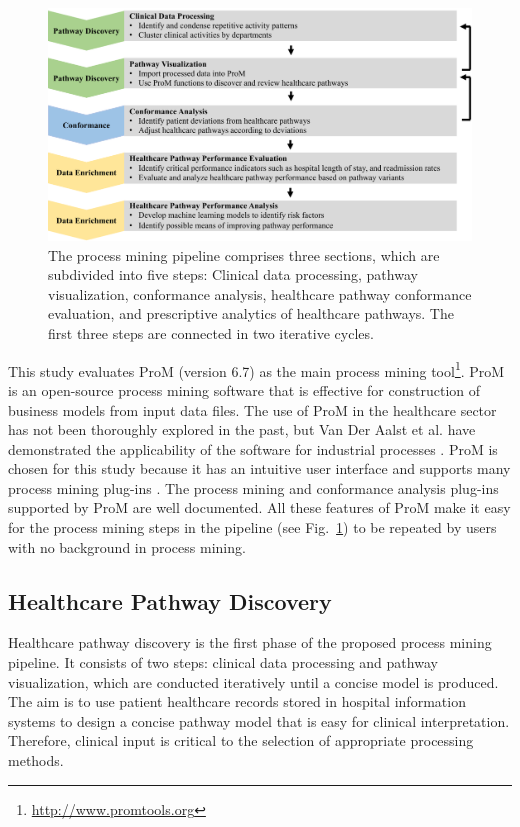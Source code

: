 \begin{figure}[t]
\centering
\includegraphics[width=\textwidth]{images/pipeline_diagram_journal.pdf}
\caption{The process mining pipeline comprises three sections, which
  are subdivided into five steps: Clinical data processing, pathway
  visualization, conformance analysis, healthcare pathway conformance
  evaluation, and prescriptive analytics of healthcare pathways. The
  first three steps are connected in two iterative cycles.}
\label{fig:pipeline}
\end{figure}

This study evaluates ProM (version 6.7) as the main process mining tool\footnote{\url{http://www.promtools.org}}. 
ProM is an open-source process mining software that is effective for construction of business models from input data files. The use of ProM in the healthcare sector has not been thoroughly explored in the past, but Van Der Aalst et al.  have demonstrated the applicability of the software for industrial processes \cite{VanDerAalst2007}. ProM is chosen for this study because it has an intuitive user interface and supports many process mining plug-ins \cite{VanDongen2005}. The process mining and conformance analysis plug-ins supported by ProM are well documented. All these features of ProM make it easy for the process mining steps in the pipeline (see Fig.~\ref{fig:pipeline}) to be repeated by users with no background in process mining.

\subsection{Healthcare Pathway Discovery}
Healthcare pathway discovery is the first phase of the proposed process mining pipeline. It consists of two steps: clinical data processing and pathway visualization, which are conducted iteratively until a concise model is produced.
The aim is to use patient healthcare records stored in hospital information systems to design a concise pathway model that is easy for clinical interpretation. Therefore, clinical input is critical to the selection of appropriate processing methods. 
 
